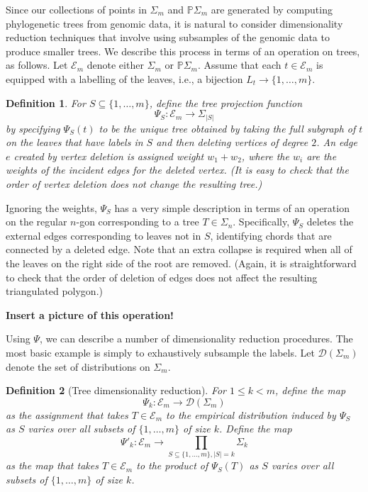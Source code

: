 \documentclass[a4paper,11pt]{article}
\newtheorem{definition}{Definition}
\newcommand{\aD}{\mathcal{D}}
\newcommand{\aE}{\mathcal{E}}
\begin{document}
Since our collections of points in $\Sigma_m$ and $\mathbb{P}\Sigma_m$ are generated by computing phylogenetic trees from genomic data, it is natural to consider dimensionality reduction techniques that involve using subsamples of the genomic data to produce smaller trees.
We describe this process in terms of an operation on trees, as follows.  
Let $\aE_m$ denote either $\Sigma_m$ or $\mathbb{P}\Sigma_m$.  
Assume that each $t \in \aE_m$ is equipped with a labelling of the leaves, i.e., a bijection $L_t \to \{1,\ldots,m\}$.

\begin{definition}
For $S \subseteq \{1,\ldots,m\}$, define the tree projection function 
\[
\Psi_S \colon \aE_m \to \Sigma_{|S|}
\] 
by specifying $\Psi_S(t)$ to be the unique tree obtained by taking the full subgraph of $t$ on the leaves that have labels in $S$ and then deleting vertices of degree $2$.  
An edge $e$ created by vertex deletion is assigned weight $w_1 + w_2$, where the $w_i$ are the weights of the incident edges for the deleted vertex.
(It is easy to check that the order of vertex deletion does not change the resulting tree.)
\end{definition}

Ignoring the weights, $\Psi_S$ has a very simple description in terms of an operation on the regular $n$-gon corresponding to a tree $T \in \Sigma_n$.  
Specifically, $\Psi_S$ deletes the external edges corresponding to leaves not in $S$, identifying chords that are connected by a deleted edge.
Note that an extra collapse is required when all of the leaves on the right side of the root are removed.
(Again, it is straightforward to check that the order of deletion of edges does not affect the resulting triangulated polygon.)

{\bf Insert a picture of this operation!}

Using $\Psi$, we can describe a number of dimensionality reduction procedures.  
The most basic example is simply to exhaustively subsample the labels.
Let $\aD(\Sigma_m)$ denote the set of distributions on $\Sigma_m$.

\begin{definition}[Tree dimensionality reduction]
For $1 \leq k < m$, define the map
\[
\Psi_k \colon \aE_m \to \aD(\Sigma_m)
\]
as the assignment that takes $T \in \aE_m$ to the empirical distribution induced by $\Psi_S$ as $S$ varies over all subsets of $\{1,\ldots,m\}$ of size $k$.  Define the map
\[
\Psi'_k \colon \aE_m \to \prod_{S \subseteq \{1,\ldots,m\}, |S| = k} \Sigma_k 
\]
as the map that takes $T \in \aE_m$ to the product of $\Psi_S(T)$ as $S$ varies over all subsets of $\{1, \ldots, m\}$ of size $k$.
\end{definition}
\end{document}
